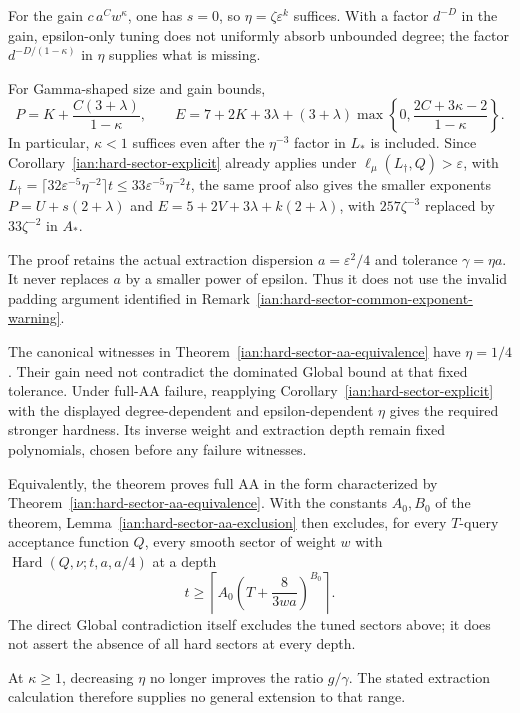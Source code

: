 \begin{remark}
\label{ian:dominated-global-bookkeeping}
For the gain \(c\,a^Cw^\kappa\), one has \(s=0\), so
\(\eta=\zeta\varepsilon^k\) suffices. With a factor \(d^{-D}\) in the
gain, epsilon-only tuning does not uniformly absorb unbounded degree;
the factor \(d^{-D/(1-\kappa)}\) in \(\eta\) supplies what is missing.

For Gamma-shaped size and gain bounds,
\[
 P=K+\frac{C(3+\lambda)}{1-\kappa},
 \qquad
 E=7+2K+3\lambda
 +(3+\lambda)\max\left\{0,
       \frac{2C+3\kappa-2}{1-\kappa}\right\}.
\]
In particular, \(\kappa<1\) suffices even after the
\(\eta^{-3}\) factor in \(L_*\) is included. Since
Corollary~\ref{ian:hard-sector-explicit} already applies under
\(\ell_\mu(L_\dagger,Q)>\varepsilon\), with
\(L_\dagger=\lceil32\varepsilon^{-5}\eta^{-2}\rceil t\le
33\varepsilon^{-5}\eta^{-2}t\), the same proof also gives the smaller
exponents \(P=U+s(2+\lambda)\) and \(E=5+2V+3\lambda+k(2+\lambda)\), with
\(257\zeta^{-3}\) replaced by \(33\zeta^{-2}\) in \(A_*\).

The proof retains the actual extraction dispersion
\(a=\varepsilon^2/4\) and tolerance \(\gamma=\eta a\).
It never replaces \(a\) by a smaller power of epsilon.
Thus it does not use the invalid padding argument identified in
Remark~\ref{ian:hard-sector-common-exponent-warning}.

The canonical witnesses in
Theorem~\ref{ian:hard-sector-aa-equivalence} have \(\eta=1/4\).
Their gain need not contradict the dominated Global bound at that
fixed tolerance. Under full-AA failure, reapplying
Corollary~\ref{ian:hard-sector-explicit} with the displayed
degree-dependent and epsilon-dependent \(\eta\) gives the required
stronger hardness. Its inverse weight and extraction depth remain
fixed polynomials, chosen before any failure witnesses.

Equivalently, the theorem proves full AA in the form characterized
by Theorem~\ref{ian:hard-sector-aa-equivalence}. With the constants
\(A_0,B_0\) of the theorem, Lemma~\ref{ian:hard-sector-aa-exclusion} then
excludes, for every \(T\)-query acceptance function \(Q\), every smooth
sector of weight \(w\) with \(\operatorname{Hard}(Q,\nu;t,a,a/4)\) at a
depth
\[
 t\ge
 \left\lceil A_0\left(T+\frac8{3wa}\right)^{B_0}\right\rceil.
\]
The direct Global contradiction itself excludes the tuned sectors
above; it does not assert the absence of all hard sectors at every
depth.

At \(\kappa\ge1\), decreasing \(\eta\) no longer improves the ratio
\(g/\gamma\). The stated extraction calculation therefore supplies
no general extension to that range.
\end{remark}


